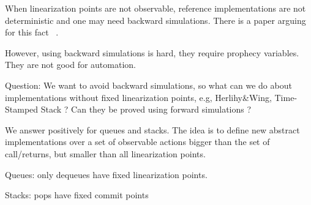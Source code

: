When linearization points are not observable, reference implementations are not deterministic and one may need backward simulations. There is a paper arguing for this fact ~\cite{DBLP:conf/cav/SchellhornWD12}.

However, using backward simulations is hard, they require prophecy variables. They are not good for automation.

Question: We want to avoid backward simulations, so what can we do about implementations without fixed linearization points, e.g, Herlihy\&Wing, Time-Stamped Stack ? Can they be proved using forward simulations ?

We answer positively for queues and stacks. The idea is to define new abstract implementations over a set of observable actions bigger than the set of call/returns, but smaller than all linearization points.

Queues: only dequeues have fixed linearization points.

Stacks: pops have fixed commit points

\newpage~\newpage
